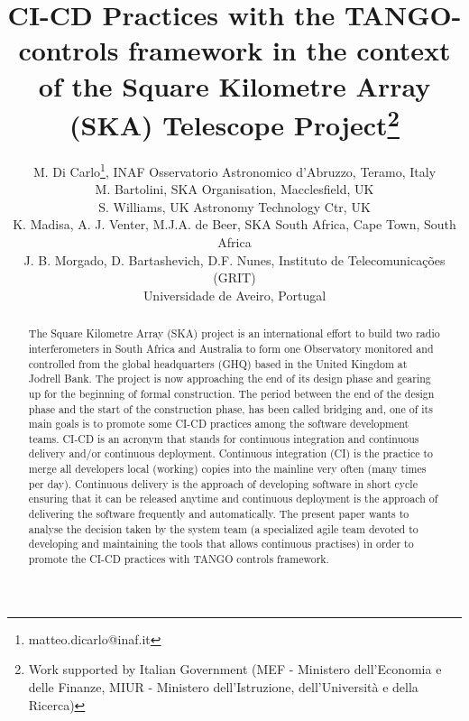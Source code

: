 \documentclass[a4paper,
               keeplastbox,   %
               ]{jacow}
\begin{document}
\title{CI-CD Practices with the TANGO-controls framework in the context of the Square Kilometre Array (SKA) Telescope Project\thanks{Work supported by Italian Government (MEF - Ministero dell'Economia e delle Finanze, MIUR - Ministero dell'Istruzione, dell'Università e della Ricerca)}}

\author{M. Di Carlo\thanks{matteo.dicarlo@inaf.it}, INAF Osservatorio Astronomico d'Abruzzo, Teramo, Italy \\
		M. Bartolini, SKA Organisation, Macclesfield, UK \\
		S. Williams, UK Astronomy Technology Ctr, UK \\
		K. Madisa, A. J. Venter, M.J.A. de Beer, SKA South Africa, Cape Town, South Africa \\
		J. B. Morgado, D. Bartashevich, D.F. Nunes, Instituto de Telecomunicações (GRIT) \\ 
		Universidade de Aveiro, Portugal}
\maketitle

%
\begin{abstract}
  The Square Kilometre Array (SKA) project is an international effort to build two radio interferometers in South Africa and Australia to form one Observatory monitored and controlled from the global headquarters (GHQ) based in the United Kingdom at Jodrell Bank. The project is now approaching the end of its design phase and gearing up for the beginning of formal construction. The period between the end of the design phase and the start of the construction phase, has been called bridging and, one of its main goals is to promote some CI-CD practices among the software development teams. CI-CD is an acronym that stands for continuous integration and continuous delivery and/or continuous deployment. Continuous integration (CI) is the practice to merge all developers local (working) copies into the mainline very often (many times per day). Continuous delivery is the approach of developing software in short cycle ensuring that it can be released anytime and continuous deployment is the approach of delivering the software frequently and automatically. The present paper wants to analyse the decision taken by the system team (a specialized agile team devoted to developing and maintaining the tools that allows continuous practises) in order to promote the CI-CD practices with TANGO controls framework. 

\end{abstract}
\end{document}
